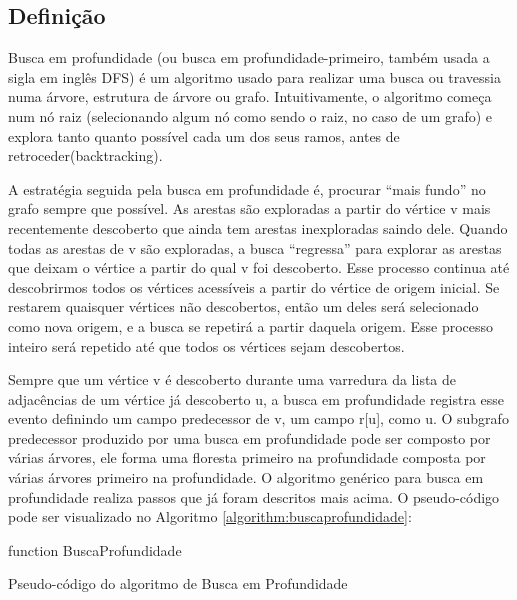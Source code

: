 \documentclass[a4paper,12pt]{article}
\begin{document}
\subsection{Definição}
Busca em profundidade (ou busca em profundidade-primeiro, também usada a sigla em inglês DFS) é um algoritmo usado para realizar uma busca ou travessia numa árvore, estrutura de árvore ou grafo. Intuitivamente, o algoritmo começa num nó raiz (selecionando algum nó como sendo o raiz, no caso de um grafo) e explora tanto quanto possível cada um dos seus ramos, antes de retroceder(backtracking).

A estratégia seguida pela busca em profundidade é, procurar “mais fundo” no grafo sempre que possível. As arestas são exploradas a partir do vértice v mais recentemente descoberto que ainda tem arestas inexploradas saindo dele. Quando todas as arestas de v são exploradas, a busca “regressa” para explorar as arestas que deixam o vértice a partir do qual v foi descoberto. Esse processo continua até descobrirmos todos os vértices acessíveis a partir do vértice de origem inicial. Se restarem quaisquer vértices não descobertos, então um deles será selecionado como  nova origem, e a busca se repetirá a partir daquela origem. Esse processo inteiro será repetido até que todos os vértices sejam descobertos.

Sempre que um vértice v é descoberto durante uma varredura da lista de adjacências de um vértice já descoberto u, a busca em profundidade registra esse evento definindo um campo predecessor de v, um campo r[u], como u. O subgrafo predecessor produzido por uma busca em profundidade pode ser composto por várias árvores, ele forma uma floresta primeiro na profundidade composta por várias árvores primeiro na profundidade.
O algoritmo genérico para busca em profundidade realiza passos que já foram descritos mais acima. O pseudo-código pode ser visualizado no Algoritmo \ref{algorithm:buscaprofundidade}:\\ 
\begin{algorithm}[H]
\LinesNumbered
\SetAlgoLined
{}
function BuscaProfundidade
\caption{Pseudo-código do algoritmo de Busca em Profundidade}
\label{algorithm:buscaprofundidade}
\end{algorithm}
\end{document}
